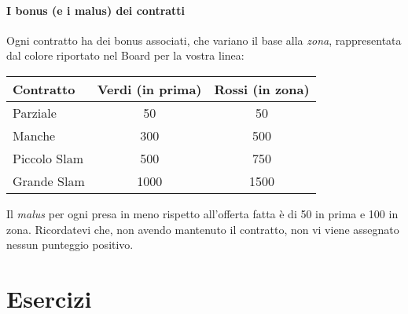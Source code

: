 \documentclass[../corsofiori.tex]{subfiles}
\begin{document}
\paragraph{I bonus (e i malus) dei contratti}

Ogni contratto ha dei bonus associati, che variano il base alla \emph{zona}, rappresentata dal colore riportato nel
Board per la vostra linea:

\bigskip
\begin{center}
\begin{tabular}{lcc}
    \toprule
    Contratto & Verdi (in prima) & Rossi (in zona)\\
    \midrule
    Parziale & 50 & 50\\
    Manche & 300 & 500\\
    Piccolo Slam & 500 & 750\\
    Grande Slam & 1000 & 1500\\
    \bottomrule
\end{tabular}
\end{center}
\bigskip

Il \emph{malus} per ogni presa in meno rispetto all'offerta fatta è di 50 in prima e 100 in zona. Ricordatevi che, non
avendo mantenuto il contratto, non vi viene assegnato nessun punteggio positivo.


\newpage
\section*{Esercizi}
\end{document}
